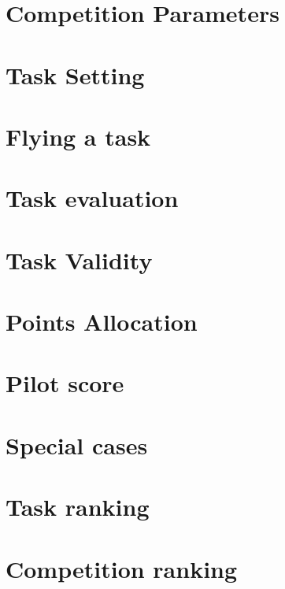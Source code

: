 \documentclass{article}
\begin{document}
\newpage
\section{Competition Parameters}


\newpage
\section{Task Setting}


\newpage
\section{Flying a task}


\newpage
\section{Task evaluation}


\newpage
\section{Task Validity}


\newpage
\section{Points Allocation}


\newpage
\section{Pilot score}


\newpage
\section{Special cases}


\newpage
\section{Task ranking}


\newpage
\section{Competition ranking}

\end{document}
